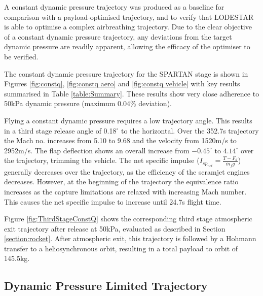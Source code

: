 \documentclass[]{aiaa-tc}
\newcommand{\PayloadToOrbitConstq}{145.5}
\newcommand{\SeparationvConstq}{2952}
\newcommand{\SeparationAngleConstq}{0.18}
\newcommand{\FlightTimeConstq}{352.7}
\begin{document}
A constant dynamic pressure trajectory was produced as a baseline for comparison with a payload-optimised trajectory, and to verify that LODESTAR is able to optimise a complex airbreathing trajectory. Due to the clear objective of a constant dynamic pressure trajectory, any deviations from the target dynamic pressure are readily apparent, allowing the efficacy of the optimiser to be verified. 

 The constant dynamic pressure trajectory for the SPARTAN stage is shown in Figures \ref{fig:constq}, \ref{fig:constq aero} and \ref{fig:constq vehicle} with key results summarised in Table \ref{table:Summary}. 
 These results show very close adherence to 50kPa dynamic pressure (maximum 0.04\% deviation). 

 Flying a constant dynamic pressure requires a low trajectory angle. This results in a third stage release angle of \SeparationAngleConstq$^\circ$ to the horizontal. Over the \FlightTimeConstq s trajectory the Mach no. increases from 5.10 to 9.68 and the velocity from 1520m/s to \SeparationvConstq m/s. The flap deflection shows an overall increase from $-0.45^\circ$ to $4.14^\circ$ over the trajectory, trimming the vehicle.  The net specific impulse ($I_{sp_{net}} = \frac{T-F_d}{\dot{m}_f g}$) generally decreases over the trajectory, as the efficiency of the scramjet engines decreases. However, at the beginning of the trajectory the equivalence ratio increases as the capture limitations are relaxed with increasing Mach number. This causes the net specific impulse to increase until  24.7s flight time. 

Figure \ref{fig:ThirdStageConstQ} shows the corresponding third stage atmospheric exit trajectory after release at 50kPa, evaluated as described in Section \ref{section:rocket}. After atmospheric exit, this trajectory is followed by a Hohmann transfer to a heliosynchronous orbit, resulting in a total payload to orbit of \PayloadToOrbitConstq kg.



\subsection{Dynamic Pressure Limited Trajectory} \label{subsection:50kPalimit}
\end{document}
